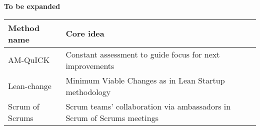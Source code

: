 \begin{center}
	{\bfseries To be expanded}
\label{adoptionmethodtable}
\begin{tabular}{p{8em} p{25em}}
    \bfseries{Method name} & \bfseries{Core idea} \\
    \hline
    AM-QuICK & Constant assessment to guide focus for next improvements \\
    Lean-change & Minimum Viable Changes as in Lean Startup methodology \\
    Scrum of Scrums & Scrum teams' collaboration via ambassadors in Scrum of
	Scrums meetings \\
    \hline
\end{tabular}
\end{center}
